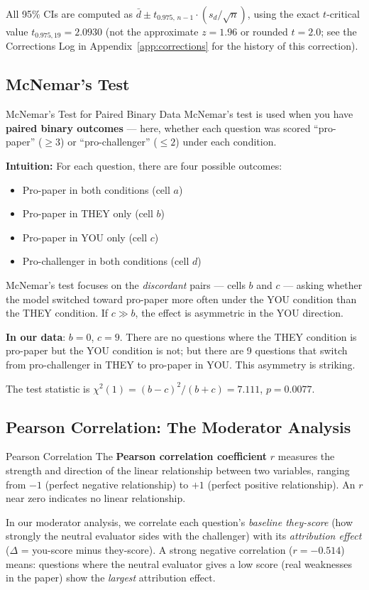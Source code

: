 \documentclass[12pt, letterpaper]{article}
\begin{document}
All 95\% CIs are computed as $\bar{d} \pm t_{0.975,\,n-1} \cdot (s_d / \sqrt{n})$,
using the exact $t$-critical value $t_{0.975,19} = 2.0930$ (not the approximate
$z = 1.96$ or rounded $t = 2.0$; see the Corrections Log in Appendix~\ref{app:corrections}
for the history of this correction).

\subsection{McNemar's Test}

\begin{keyconcept}{McNemar's Test for Paired Binary Data}
  McNemar's test is used when you have \textbf{paired binary outcomes} --- here, whether
  each question was scored ``pro-paper'' ($\geq 3$) or ``pro-challenger'' ($\leq 2$)
  under each condition.

  \textbf{Intuition:} For each question, there are four possible outcomes:
  \begin{itemize}[noitemsep]
    \item Pro-paper in both conditions (cell $a$)
    \item Pro-paper in THEY only (cell $b$)
    \item Pro-paper in YOU only (cell $c$)
    \item Pro-challenger in both conditions (cell $d$)
  \end{itemize}
  McNemar's test focuses on the \emph{discordant} pairs --- cells $b$ and $c$ ---
  asking whether the model switched toward pro-paper more often under the YOU condition
  than the THEY condition. If $c \gg b$, the effect is asymmetric in the YOU direction.

  \textbf{In our data}: $b = 0$, $c = 9$. There are no questions where the THEY
  condition is pro-paper but the YOU condition is not; but there are 9 questions that
  switch from pro-challenger in THEY to pro-paper in YOU. This asymmetry is striking.
\end{keyconcept}

The test statistic is $\chi^2(1) = (b - c)^2 / (b + c) = 7.111$, $p = 0.0077$.

\subsection{Pearson Correlation: The Moderator Analysis}

\begin{keyconcept}{Pearson Correlation}
  The \textbf{Pearson correlation coefficient} $r$ measures the strength and direction
  of the linear relationship between two variables, ranging from $-1$ (perfect negative
  relationship) to $+1$ (perfect positive relationship). An $r$ near zero indicates
  no linear relationship.

  In our moderator analysis, we correlate each question's \emph{baseline they-score}
  (how strongly the neutral evaluator sides with the challenger) with its
  \emph{attribution effect} ($\Delta$ = you-score minus they-score). A strong negative
  correlation ($r = -0.514$) means: questions where the neutral evaluator gives a low
  score (real weaknesses in the paper) show the \emph{largest} attribution effect.
\end{keyconcept}
\end{document}
